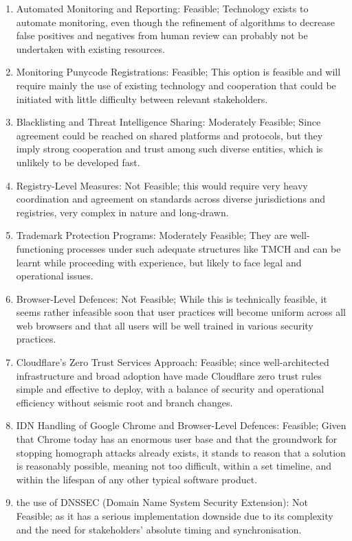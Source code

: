  \begin{enumerate}
  \item Automated Monitoring and Reporting: Feasible; Technology exists to automate monitoring, even though the refinement of algorithms to decrease false positives and negatives from human review can probably not be undertaken with existing resources.
  \item  Monitoring Punycode Registrations: Feasible; This option is feasible and will require mainly the use of existing technology and cooperation that could be initiated with little difficulty between relevant stakeholders.
  \item Blacklisting and Threat Intelligence Sharing: Moderately Feasible; Since agreement could be reached on shared platforms and protocols, but they imply strong cooperation and trust among such diverse entities, which is unlikely to be developed fast.
  \item Registry-Level Measures: Not Feasible; this would require very heavy coordination and agreement on standards across diverse jurisdictions and registries, very complex in nature and long-drawn.
  \item Trademark Protection Programs: Moderately Feasible; They are well-functioning processes under such adequate structures like TMCH and can be learnt while proceeding with experience, but likely to face legal and operational issues.
  \item  Browser-Level Defences: Not Feasible; While this is technically feasible, it seems rather infeasible soon that user practices will become uniform across all web browsers and that all users will be well trained in various security practices.
  \item Cloudflare's Zero Trust Services Approach: Feasible; since well-architected infrastructure and broad adoption have made Cloudflare zero trust rules simple and effective to deploy, with a balance of security and operational efficiency without seismic root and branch changes.
  \item IDN Handling of Google Chrome and Browser-Level Defences: Feasible; Given that Chrome today has an enormous user base and that the groundwork for stopping homograph attacks already exists, it stands to reason that a solution is reasonably possible, meaning not too difficult, within a set timeline, and within the lifespan of any other typical software product.
  \item the use of DNSSEC (Domain Name System Security Extension):  Not Feasible; as it has a serious implementation downside due to its complexity and the need for stakeholders' absolute timing and synchronisation.
  
\end{enumerate}




